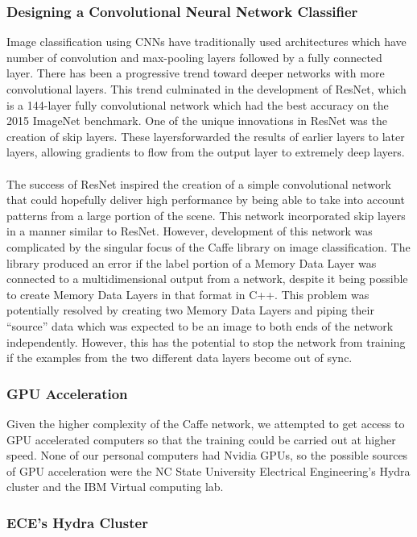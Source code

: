 \documentclass[12pt]{article}
\begin{document}
\subsubsection{Designing a Convolutional Neural Network Classifier}

	Image classification using CNNs have traditionally used architectures which have number of convolution and max-pooling layers followed by a fully connected layer.  There has been a progressive trend toward deeper networks with more convolutional layers.  This trend culminated in the development of ResNet, which is a 144-layer fully convolutional network which had the best accuracy on the 2015 ImageNet benchmark.  One of the unique innovations in ResNet was the creation of skip layers. These layersforwarded the results of earlier layers to later layers, allowing gradients to flow from the output layer to extremely deep layers.\\ 
\\
	The success of ResNet inspired the creation of a simple convolutional network that could hopefully deliver high performance by being able to take into account patterns from a large portion of the scene.  This network incorporated skip layers in a manner similar to ResNet.  However, development of this network was complicated by the singular focus of the Caffe library on image classification.  The library produced an error if the label portion of a Memory Data Layer was connected to a multidimensional output from a network, despite it being possible to create Memory Data Layers in that format in C++.  This problem was potentially resolved by creating two Memory Data Layers and piping their “source” data which was expected to be an image to both ends of the network independently.  However, this has the potential to stop the network from training if the examples from the two different data layers become out of sync.

\subsubsection{GPU Acceleration}

	Given the higher complexity of the Caffe network, we attempted to get access to GPU accelerated computers so that the training could be carried out at higher speed.  None of our personal computers had Nvidia GPUs, so the possible sources of GPU acceleration were the NC State University Electrical Engineering's Hydra cluster and the IBM Virtual computing lab.

\subsubsection{ECE's Hydra Cluster}
\end{document}
